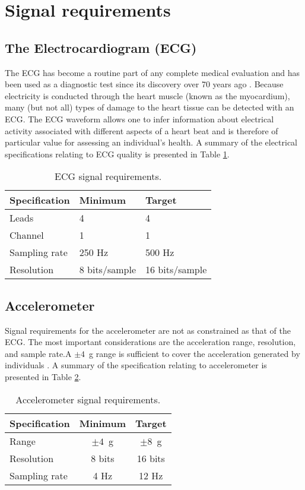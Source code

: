 \section{Signal requirements}\label{signal requirements}
\subsection{The Electrocardiogram (ECG)}

The ECG has become a routine part of any complete medical evaluation
and has been used as a diagnostic test since its discovery over 70
years ago \cite{ecg}. Because electricity is conducted through the
heart muscle (known as the myocardium), many (but not all) types of
damage to the heart tissue can be detected with an ECG. The ECG
waveform allows one to infer information about electrical activity
associated with different aspects of a heart beat and is therefore of
particular value for assessing an individual's health. A summary of
the electrical specifications relating to ECG quality is presented in
Table \ref{table:ecg}.

\begin{table}
  \caption{ECG signal requirements.}
  \label{table:ecg}
  \centering
  \begin{tabular}{|l|l|l|}
    \hline
    Specification & Minimum & Target \\
    \hline
    Leads & 4 & 4 \\
    Channel & 1 & 1 \\
    Sampling rate & 250 Hz & 500 Hz \\
    Resolution & 8 bits/sample & 16 bits/sample \\
    \hline
  \end{tabular}
\end{table}

\subsection{Accelerometer}

Signal requirements for the accelerometer are not as constrained as
that of the ECG. The most important considerations are the
acceleration range, resolution, and sample rate.A $\pm 4$~g range is
sufficient to cover the acceleration generated by individuals
\cite{wearable_ecg}. A summary of the specification relating to
accelerometer is presented in Table \ref{table:acc}.

\begin{table}
	\caption{Accelerometer signal requirements.}
	\label{table:acc}
	\centering
	\begin{tabular}{|l |c|c|}
		\hline
		Specification & Minimum & Target \\
		\hline
		Range & $\pm 4$~g & $\pm 8$~g \\
		Resolution & 8 bits & 16 bits\\
		Sampling rate & 4 Hz & 12 Hz \\
		\hline
	\end{tabular}
\end{table}

